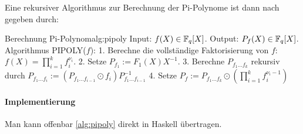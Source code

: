 Eine rekursiver Algorithmus zur Berechnung der Pi-Polynome ist dann nach
\autocite[Abschnitt 4]{hach92} gegeben durch:
\begin{pseudocode}{Berechnung Pi-Polynom}{alg:pipoly}
Input: $f(X) \in \mathbb{F}_q[X]$.
Output: $P_f(X) \in \mathbb{F}_q[X]$.
Algorithmus PIPOLY($f$):
  1. Berechne die vollständige Faktorisierung von $f$:
     $f(X) = \prod_{i=1}^k f_i^{\nu_i}$.
  2. Setze $P_{f_1} := F_1(X) X^{-1}$.
  3. Berechne $P_{f_1\ldots f_k}$ rekursiv durch
     $P_{f_1\ldots f_i} := (P_{f_1\ldots f_{i-1}} \odot f_i) P_{f_1\ldots f_{i-1}}^{-1}$
  4. Setze $P_f := P_{f_1\ldots f_k} \odot ( \prod_{i=1}^k f_i^{\nu_i-1})$
\end{pseudocode}

\paragraph{Implementierung} Man kann offenbar \autoref{alg:pipoly} direkt
in Haskell übertragen.


